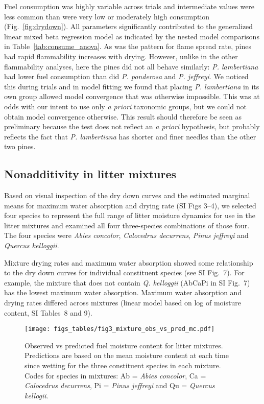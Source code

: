\documentclass[letterpaper,12pt]{article}
\begin{document}
Fuel consumption was highly variable across trials and intermediate values were
less common than were very low or moderately high consumption
(Fig.~\ref{fig:drydown}). All parameters significantly contributed to the
generalized linear mixed beta regression model as indicated by the nested model
comparisons in Table~\ref{tab:consume_anova}. As was the pattern for flame
spread rate, pines had rapid flammability increases with drying. However,
unlike in the other flammability analyses, here the pines did not all behave
similarly: \emph{P. lambertiana} had lower fuel consumption than did \emph{P.
  ponderosa} and \emph{P. jeffreyi}. We noticed this during trials and in model
fitting we found that placing \emph{P. lambertiana} in its own group allowed
model convergence that was otherwise impossible. This was at odds with our
intent to use only \emph{a priori} taxonomic groups, but we could not obtain
model convergence otherwise. This result should therefore be seen as
preliminary because the test does not reflect an \emph{a priori} hypothesis,
but probably reflects the fact that \emph{P. lambertiana} has shorter and finer
needles than the other two pines.


\subsection*{Nonadditivity in  litter mixtures}

Based on visual inspection of the dry down curves and the estimated marginal
means for maximum water absorption and drying rate (SI Figs 3--4), we selected
four species to represent the full range of litter moisture dynamics for use in
the litter mixtures and examined all four three-species combinations of those
four. The four species were \emph{Abies concolor}, \emph{Calocedrus decurrens},
\emph{Pinus jeffreyi} and \emph{Quercus kelloggii}.

Mixture drying rates and maximum water absorption showed some relationship to
the dry down curves for individual constituent species (see SI Fig.~7). For
example, the mixture that does not contain \emph{Q. kelloggii} (AbCaPi in SI
Fig.~7) has the lowest maximum water absorption. Maximum water absorption and
drying rates differed across mixtures (linear model based on log of moisture
content, SI Tables~8 and 9).


\begin{figure}[h]
  \centering
\texttt{[image: figs\_tables/fig3\_mixture\_obs\_vs\_pred\_mc.pdf]}
\caption{Observed vs predicted fuel moisture content for litter mixtures.
  Predictions are based on the mean moisture content at each time since wetting
  for the three constituent species in each mixture. Codes for species in
  mixtures: Ab = \emph{Abies concolor}, Ca = \emph{Calocedrus decurrens}, Pi =
  \emph{Pinus jeffreyi} and Qu = \emph{Quercus kellogii}.}
  \label{fig:mixture_obs_pred_mc}
\end{figure}
\end{document}
